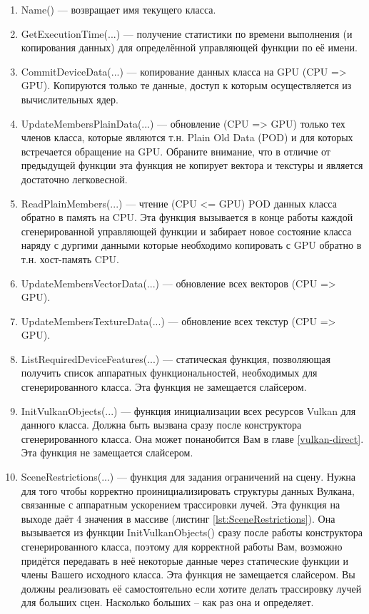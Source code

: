 \documentclass[11pt,fleqn,english,russian]{report} %
\begin{document}
\begin{enumerate}
	\item Name() --- возвращает имя текущего класса. 
	
	\item GetExecutionTime(...) --- получение статистики по времени выполнения (и копирования данных) для определённой управляющей функции по её имени.
	\item CommitDeviceData(...) --- копирование данных класса на GPU (CPU => GPU). Копируются только те данные, доступ к которым осуществляется из вычислительных ядер. 
	
	\item UpdateMembersPlainData(...) --- обновление (CPU => GPU) только тех членов класса, которые являются т.н. Plain Old Data (POD) и для которых встречается обращение на GPU. Обраните внимание, что в отличие от предыдущей функции эта функция не копирует вектора и текстуры и является достаточно легковесной.
	
	\item ReadPlainMembers(...) --- чтение (CPU <= GPU) POD данных класса обратно в память на CPU. Эта функция вызывается в конце работы каждой сгенерированной управляющей функции и забирает новое состояние класса наряду с дургими данными которые необходимо копировать с GPU обратно в т.н. хост-память CPU.
	
	\item UpdateMembersVectorData(...) --- обновление всех векторов (CPU => GPU).
	
    \item UpdateMembersTextureData(...) --- обновление всех текстур (CPU => GPU).
    
    \item ListRequiredDeviceFeatures(...) --- статическая функция, позволяющая получить список аппаратных функциональностей, необходимых для сгенерированного класса. Эта функция не замещается слайсером.
    
    \item InitVulkanObjects(...) --- функция инициализации всех ресурсов Vulkan для данного класса. Должна быть вызвана сразу после конструктора сгенерированного класса. Она может понанобится Вам в главе \ref{vulkan-direct}. Эта функция не замещается слайсером.
    
    \item SceneRestrictions(...) --- функция для задания ограничений на сцену. Нужна для того чтобы корректно проинициализировать структуры данных Вулкана, связанные с аппаратным ускорением трассировки лучей. Эта функция на выходе даёт 4 значения в массиве (листинг \ref{lst:SceneRestrictions}). Она вызывается из функции InitVulkanObjects() сразу после работы конструктора сгенерированного класса, поэтому для корректной работы Вам, возможно придётся передавать в неё некоторые данные через статические функции и члены Вашего исходного класса. Эта функция не замещается слайсером. Вы должны реализовать её самостоятельно если хотите делать трассировку лучей для больших сцен. Насколько больших -- как раз она и определяет.
     
\end{enumerate}
\end{document}

